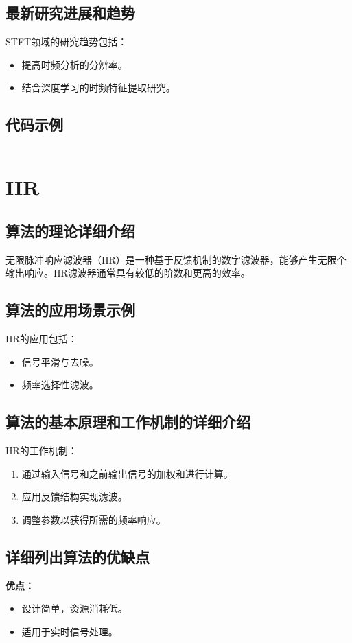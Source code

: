 \subsection*{最新研究进展和趋势}
STFT领域的研究趋势包括：
\begin{itemize}
    \item 提高时频分析的分辨率。
    \item 结合深度学习的时频特征提取研究。
\end{itemize}
\subsection*{代码示例}
\begin{lstlisting}

\end{lstlisting}


\section{IIR}
\subsection*{算法的理论详细介绍}
无限脉冲响应滤波器（IIR）是一种基于反馈机制的数字滤波器，能够产生无限个输出响应。IIR滤波器通常具有较低的阶数和更高的效率。

\subsection*{算法的应用场景示例}
IIR的应用包括：
\begin{itemize}
    \item 信号平滑与去噪。
    \item 频率选择性滤波。
\end{itemize}

\subsection*{算法的基本原理和工作机制的详细介绍}
IIR的工作机制：
\begin{enumerate}
    \item 通过输入信号和之前输出信号的加权和进行计算。
    \item 应用反馈结构实现滤波。
    \item 调整参数以获得所需的频率响应。
\end{enumerate}

\subsection*{详细列出算法的优缺点}
\textbf{优点：}
\begin{itemize}
    \item 设计简单，资源消耗低。
    \item 适用于实时信号处理。
\end{itemize}

